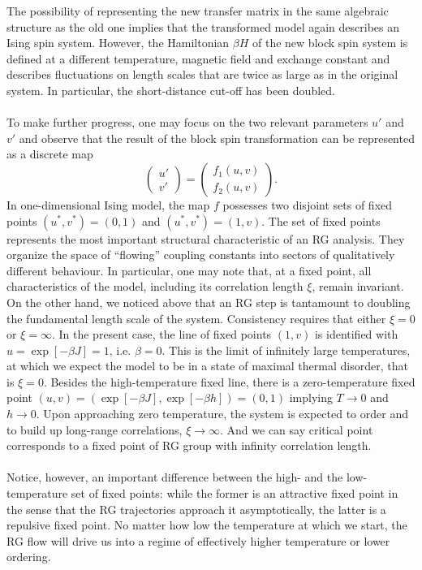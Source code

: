 The possibility of representing the new transfer matrix in the same algebraic structure as the old one implies that the transformed model again describes an Ising spin system. However, the Hamiltonian $\beta H$ of the new block spin system is defined at a different temperature, magnetic field and exchange constant and describes fluctuations on length scales that are twice as large as in the original system.
In particular, the short-distance cut-off has been doubled.
\\ \\
To make further progress, one may focus on the two relevant parameters $u'$ and $v'$ and observe that the result of the block spin transformation can be represented as a discrete map
\[\begin{pmatrix} u' \\ v' \end{pmatrix} = \begin{pmatrix}
f_1(u,v) \\ f_2(u,v)
\end{pmatrix} .\]
In one-dimensional Ising model, the map $f$ possesses two
disjoint sets of fixed points $(u^*,v^*) = (0,1)$ and $(u^*,v^*) = (1,v)$.
The set of fixed points represents the most important structural characteristic of an RG analysis. 
They organize the space of ``flowing'' coupling constants into sectors of qualitatively different behaviour. 
In particular, one may note that, at a fixed point, all characteristics of the model, including its correlation length $\xi$, remain invariant.
On the other hand, we noticed above that an RG step is tantamount to doubling the fundamental length scale of the system.
Consistency requires that either $\xi = 0$ or $\xi = \infty$. 
In the present case, the line of fixed points $(1,v)$ is identified with $u = \exp[-\beta J] = 1$, i.e. $\beta = 0$.
This is the limit of infinitely large temperatures, at which we expect the model to be in a state of maximal thermal disorder, that is $\xi = 0$.
Besides the high-temperature fixed line, there is a zero-temperature fixed point $(u, v) = (\exp[−\beta J], \exp[−\beta h]) = (0, 1)$ implying $T \to 0$ and $h \to 0$. 
Upon approaching zero temperature, the system is expected to order and to build up long-range correlations, $\xi \to \infty$. And we can say critical point corresponds to a fixed point of RG group with infinity correlation length.
\\ \\
Notice, however, an important difference between the high- and the low-temperature set of fixed points: while the former is an attractive fixed point in the sense that the RG trajectories approach it asymptotically, the latter is a repulsive fixed point. No matter how low the temperature at which we start, the RG flow will drive us into a regime of effectively higher temperature or lower ordering. 
